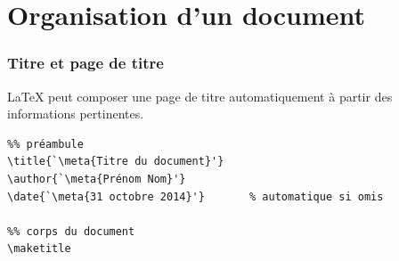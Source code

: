 
\section{Organisation d'un document}

\begin{frame}[plain]
\end{frame}

\begin{frame}[fragile]
  \frametitle{Titre et page de titre}
  {\LaTeX} peut composer une page de titre automatiquement à partir
  des informations pertinentes.

  \begin{lstlisting}
%% préambule
\title{`\meta{Titre du document}'}
\author{`\meta{Prénom Nom}'}
\date{`\meta{31 octobre 2014}'}       % automatique si omis

%% corps du document
\maketitle
  \end{lstlisting}
\end{frame}


